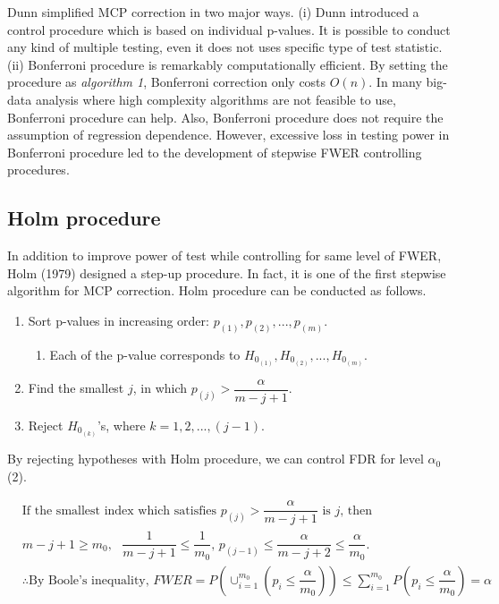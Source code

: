 \documentclass[a4paper, 11pt, oneside]{article}
\begin{document}
Dunn simplified MCP correction in two major ways. (i) Dunn introduced a control procedure which is based on individual p-values. It is possible to conduct any kind of multiple testing, even it does not uses specific type of test statistic. (ii) Bonferroni procedure is remarkably computationally efficient. By setting the procedure as \textit{algorithm 1}, Bonferroni correction only costs $O(n)$. In many big-data analysis where high complexity algorithms are not feasible to use, Bonferroni procedure can help. Also, Bonferroni procedure does not require the assumption of regression dependence. However, excessive loss in testing power in Bonferroni procedure led to the development of stepwise FWER controlling procedures.

\subsection{Holm procedure}
In addition to improve power of test while controlling for same level of FWER, Holm (1979) designed a step-up procedure. In fact, it is one of the first stepwise algorithm for MCP correction. Holm procedure can be conducted as follows. 
\begin{enumerate}
  \item Sort p-values in increasing order: $p_{(1)}, p_{(2)}, ..., p_{(m)}$.
    \begin{enumerate}[-]
    \item Each of the p-value corresponds to $H_{0_{(1)}}, H_{0_{(2)}}, ..., H_{0_{(m)}}$. 
    \end{enumerate}
  \item Find the smallest $j$, in which $p_{(j)} > \dfrac{\alpha}{m-j+1}$.
  \item Reject $H_{0_{(k)}}$'s, where $k=1, 2, ..., (j-1)$.
\end{enumerate}

By rejecting hypotheses with Holm procedure, we can control FDR for level $\alpha_0$ (2).

\begin{equation}
\begin{aligned}\label{proof-bonf}
& \text{If the smallest index which satisfies } p_{(j)} > \dfrac{\alpha}{m-j+1} \text{ is } j \text{, then} \\
& m-j+1 \geq m_0,\text{ } \dfrac{1}{m-j+1} \leq \dfrac{1}{m_0} \text{,  }
p_{(j-1)} \leq \dfrac{\alpha}{m-j+2} \leq \dfrac{\alpha}{m_0}.\\
& \therefore \text{By Boole's inequality, } FWER=P(\cup_{i=1}^{m_0}(p_i\leq\dfrac{\alpha}{m_0}))\leq\sum_{i=1}^{m_0}P(p_i\leq\dfrac{\alpha}{m_0})=\alpha\\
\end{aligned}
\end{equation}
\end{document}
